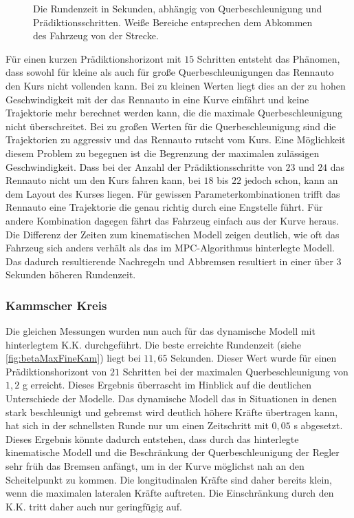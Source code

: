 \documentclass{like}
\begin{document}
\begin{figure}[ht!]
	\centering
	 
	\caption{Die Rundenzeit in Sekunden, abhängig von Querbeschleunigung und Prädiktionsschritten. Weiße Bereiche entsprechen dem Abkommen des Fahrzeug von der Strecke.}
	\label{fig:betaMaxFine}
\end{figure}
Für einen kurzen Prädiktionshorizont mit $15$ Schritten entsteht das Phänomen, dass sowohl für kleine als auch für große Querbeschleunigungen das Rennauto den Kurs nicht vollenden kann. Bei zu kleinen Werten liegt dies an der zu hohen Geschwindigkeit mit der das Rennauto in eine Kurve einfährt und keine Trajektorie mehr berechnet werden kann, die die maximale Querbeschleunigung nicht überschreitet. Bei zu großen Werten für die Querbeschleunigung sind die Trajektorien zu aggressiv und das Rennauto rutscht vom Kurs. Eine Möglichkeit diesem Problem zu begegnen ist die Begrenzung der maximalen zulässigen Geschwindigkeit. Dass bei der Anzahl der Prädiktionsschritte von $23$ und $24$ das Rennauto nicht um den Kurs fahren kann, bei $18$ bis $22$ jedoch schon, kann an dem Layout des Kurses liegen. Für gewissen Parameterkombinationen trifft das Rennauto eine Trajektorie die genau richtig durch eine Engstelle führt. Für andere Kombination dagegen fährt das Fahrzeug einfach aus der Kurve heraus. Die Differenz der Zeiten zum kinematischen Modell zeigen deutlich, wie oft das Fahrzeug sich anders verhält als das im \ac{MPC}-Algorithmus hinterlegte Modell. Das dadurch resultierende Nachregeln und Abbremsen resultiert in einer über $3$ Sekunden höheren Rundenzeit.

\subsubsection{Kammscher Kreis}
Die gleichen Messungen wurden nun auch für das dynamische Modell mit hinterlegtem \ac{K.K.} durchgeführt. Die beste erreichte Rundenzeit (siehe \ref{fig:betaMaxFineKam}) liegt bei $11,65$ Sekunden. Dieser Wert wurde für einen Prädiktionshorizont von $21$ Schritten bei der maximalen Querbeschleunigung von $1,2$ g erreicht. Dieses Ergebnis überrascht im Hinblick auf die deutlichen Unterschiede der Modelle. Das dynamische Modell das in Situationen in denen stark beschleunigt und gebremst wird deutlich höhere Kräfte übertragen kann, hat sich in der schnellsten Runde nur um einen Zeitschritt mit $0,05$ s abgesetzt. Dieses Ergebnis könnte dadurch entstehen, dass durch das hinterlegte kinematische Modell und die Beschränkung der Querbeschleunigung der Regler sehr früh das Bremsen anfängt, um in der Kurve möglichst nah an den Scheitelpunkt zu kommen. 
Die longitudinalen Kräfte sind daher bereits klein, wenn die maximalen lateralen Kräfte auftreten. Die Einschränkung durch den 
\ac{K.K.} tritt daher auch nur geringfügig auf.
\end{document}
